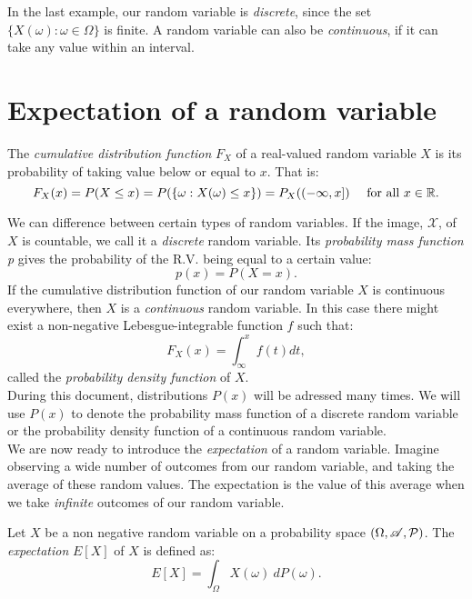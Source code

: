 In the last example, our random variable is \emph{discrete}, since the set $\{X(\omega): \omega \in \Omega\}$ is finite.
 A random variable can also be \emph{continuous}, if it can take any value within an interval.\\


\section{Expectation of a random variable}

\begin{ndef}
The \emph{cumulative distribution function } $F_X$ of a real-valued random variable $X$ is its probability of taking value below or equal to $x$. That is:
$$
F_X(x) = P(X \leq x) = P(\{\omega : X(\omega) \leq x\}) = P_X((-\infty,x]) \quad \text{ for all } x \in \mathbb{R} .
$$
\end{ndef}

We can difference between certain types of random variables. If the image, $\mathcal X$, of $X$ is countable, we call it a \emph{discrete} random variable. Its \emph{probability mass function p} gives the
probability of the R.V. being equal to a certain value:
$$
p(x) = P(X = x).
$$
If the cumulative distribution function of our random variable $X$ is continuous everywhere, then $X$ is a \emph{continuous} random variable.
 In this case there might exist a non-negative Lebesgue-integrable function $f$ such that:
$$
F_X(x) = \int_{\infty}^x f(t) dt,
$$
called the \emph{probability density function} of $X$.\\

During this document, distributions $P(x)$ will be adressed many times. We will use $P(x)$ to denote the probability mass function of a discrete random variable or the probability density function of a continuous random variable.\\

We are now ready to introduce the \emph{expectation} of a random variable. Imagine observing a wide number of outcomes from our random variable, and taking the average of these random values. The expectation is the value of this average when we 
take \emph{infinite} outcomes of our random variable.

\begin{ndef}\label{def:expectation}
Let $X$ be a non negative random variable on a probability space $(\Omega,\mathscr{A},\mathcal{P})$. The \emph{expectation} $E[X]$ of $X$ is defined as:
$$
E[X] = \int_\Omega X(\omega) \ dP(\omega).
$$
\end{ndef}

